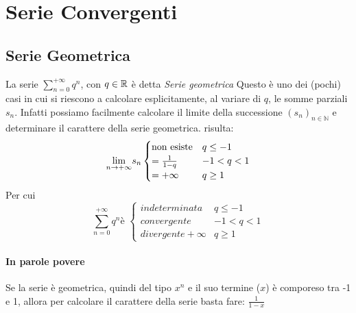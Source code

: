 \documentclass[12pt, a4paper, openany]{book}
\begin{document}
	\section{Serie Convergenti}
	\subsection{Serie Geometrica}
	La serie $\sum_{n=0}^{+\infty} q^n$, con $q \in \mathbb{R}$ è detta \emph{Serie geometrica}
	Questo è uno dei (pochi) casi in cui si riescono a calcolare esplicitamente, al variare di $q$, le somme parziali $s_n$.
	Infatti possiamo facilmente calcolare il limite della successione $(s_n)_{n\in \mathbb{N}}$ e determinare il carattere della serie geometrica.
	risulta:
	\begin{equation}
		\underset{n \to +\infty}{\lim} s_n \begin{cases}
			\text{non esiste} & q \leq -1  \\
			= \frac{1}{1-q}   & -1 < q < 1 \\
			= +\infty         & q \geq 1
		\end{cases}
	\end{equation}
	Per cui
	\begin{equation}
		\sum_{n=0}^{+\infty} q^n \text{è } \begin{cases}
			indeterminata      & q \leq -1  \\
			convergente        & -1 < q < 1 \\
			divergente +\infty & q \geq 1
		\end{cases}
	\end{equation}


	\paragraph{In parole povere}
	Se la serie è geometrica, quindi del tipo $x^n$ e il suo termine ($x$) è comporeso tra -1 e 1, allora per calcolare il carattere della serie basta fare: $\frac{1}{1-x}$
	\\
\end{document}
